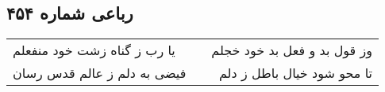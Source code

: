 \begin{center}
\section*{رباعی شماره ۴۵۴}
\label{sec:sh454}
\begin{longtable}{l p{0.5cm} r}
یا رب ز گناه زشت خود منفعلم
&&
وز قول بد و فعل بد خود خجلم
\\
فیضی به دلم ز عالم قدس رسان
&&
تا محو شود خیال باطل ز دلم
\\
\end{longtable}
\end{center}
